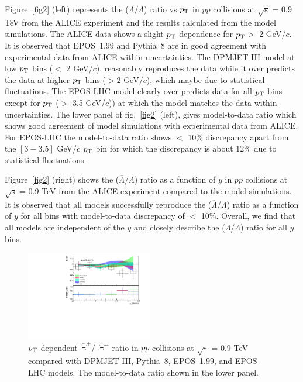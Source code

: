 \documentclass{article}
\newcommand{\sqrts}{\mbox{$\sqrt{\mathrm{s}}$}}
\newcommand{\axi}{$\overline{\Xi}^+$}
\newcommand{\xim}{$\Xi^-$}
\newcommand{\alam}{$\overline{\Lambda}$}
\newcommand{\lam}{$\Lambda$}
\newcommand{\ppt}{$p_{\rm T}$}
\begin{document}
Figure~\ref{fig2} (left) represents the ({\alam /\lam}) ratio vs {\ppt} in $pp$ collisions at {\sqrts} = 0.9 TeV from the ALICE experiment and the results calculated from the model simulations. The ALICE data  shows a slight {\ppt} dependence for {\ppt}$>$ 2 GeV/$c$. It is observed that EPOS~1.99 and Pythia~8 are in good agreement with experimental data from ALICE within uncertainties. The DPMJET-III model at low {\ppt} bins ($<$ 2 GeV/$c$), reasonably reproduces the data while it over predicts the data at higher {\ppt} bins ($> 2$ GeV/$c$), which maybe due to statistical fluctuations. The EPOS-LHC model clearly over predicts data for all {\ppt} bins except for {\ppt} ($>$ 3.5 GeV/$c$)) at which the model matches the data within uncertainties. The lower panel of fig.~\ref{fig2} (left), gives model-to-data ratio which shows good agreement of model simulations with experimental data from ALICE. For EPOS-LHC the model-to-data ratio shows $<$ 10\% discrepancy apart from the $[3-3.5]$ GeV/$c$ {\ppt} bin for which the discrepancy is about 12\% due to statistical fluctuations. 

Figure~\ref{fig2} (right) shows the ({\alam /\lam}) ratio as a function of $y$ in $pp$ collisions at {\sqrts} = 0.9 TeV from the ALICE experiment compared to the model simulations. It is observed that all models successfully reproduce the ({\alam /\lam}) ratio as a function of $y$ for all bins with  model-to-data discrepancy of $<$ 10\%. Overall, we find that all models are independent of the $y$ and closely describe the ({\alam /\lam}) ratio for all $y$ bins.      



\begin{figure}[!ht]
\centering
\includegraphics[width=0.49\textwidth,height=0.35\textheight]{zai_pt_0.9.pdf}
\caption{{\ppt} dependent {\axi / \xim} ratio in $pp$ collisions at {\sqrts} = 0.9 TeV compared with DPMJET-III, Pythia~8, EPOS~1.99, and EPOS-LHC models. The model-to-data ratio shown in the lower panel. }
\label{fig3}
\end{figure}
\end{document}
